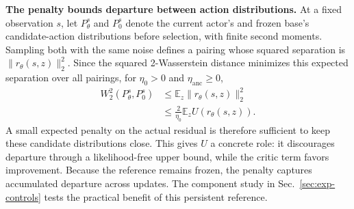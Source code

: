 \textbf{The penalty bounds departure between action distributions.}
At a fixed observation $s$, let $P_\theta^s$ and $P_0^s$ denote the current actor's and frozen base's candidate-action distributions before selection, with finite second moments. Sampling both with the same noise defines a pairing whose squared separation is $\|r_\theta(s,z)\|_2^2$. Since the squared 2-Wasserstein distance minimizes this expected separation over all pairings, for $\eta_0>0$ and $\eta_{\mathrm{anc}}\geq0$,
\begin{equation}
\begin{aligned}
W_2^2(P_\theta^s,P_0^s)
&\leq \mathbb E_z\|r_\theta(s,z)\|_2^2\\
&\leq \frac{2}{\eta_0}\mathbb E_zU(r_\theta(s,z)).
\end{aligned}
\label{eq:coupling-bound}
\end{equation}
A small expected penalty on the actual residual is therefore sufficient to keep these candidate distributions close. This gives $U$ a concrete role: it discourages departure through a likelihood-free upper bound, while the critic term favors improvement. Because the reference remains frozen, the penalty captures accumulated departure across updates. The component study in Sec.~\ref{sec:exp-controls} tests the practical benefit of this persistent reference.